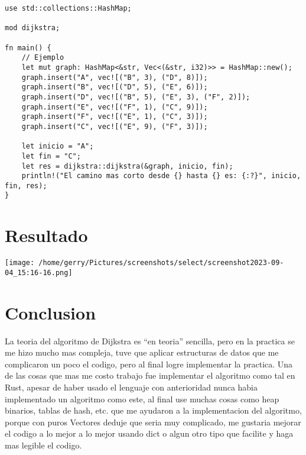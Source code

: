 \documentclass{article}
\begin{document}
\begin{verbatim}
use std::collections::HashMap;

mod dijkstra;

fn main() {
    // Ejemplo
    let mut graph: HashMap<&str, Vec<(&str, i32)>> = HashMap::new();
    graph.insert("A", vec![("B", 3), ("D", 8)]);
    graph.insert("B", vec![("D", 5), ("E", 6)]);
    graph.insert("D", vec![("B", 5), ("E", 3), ("F", 2)]);
    graph.insert("E", vec![("F", 1), ("C", 9)]);
    graph.insert("F", vec![("E", 1), ("C", 3)]);
    graph.insert("C", vec![("E", 9), ("F", 3)]);

    let inicio = "A";
    let fin = "C";
    let res = dijkstra::dijkstra(&graph, inicio, fin);
    println!("El camino mas corto desde {} hasta {} es: {:?}", inicio, fin, res);
}
\end{verbatim}

\section*{Resultado}

\begin{center}
    \texttt{[image: /home/gerry/Pictures/screenshots/select/screenshot2023-09-04\_15:16-16.png]}
\end{center}

\section*{Conclusion}
La teoria del algoritmo de Dijkstra es ``en teoria'' sencilla, pero en la practica se me hizo
mucho mas compleja, tuve que aplicar estructuras de datos que me
complicaron un poco el codigo, pero al final logre implementar la practica. Una
de las cosas que mas me costo trabajo fue implementar el algoritmo como tal en Rust,
apesar de haber usado el lenguaje con anterioridad nunca habia implementado un algoritmo como
este, al final use muchas cosas como heap binarios, tablas de hash, etc. que me ayudaron a
la implementacion del algoritmo, porque con puros Vectores deduje que seria muy complicado, me gustaria
mejorar el codigo a lo mejor a lo mejor usando dict o algun otro tipo que facilite y haga mas
legible el codigo.
\end{document}
